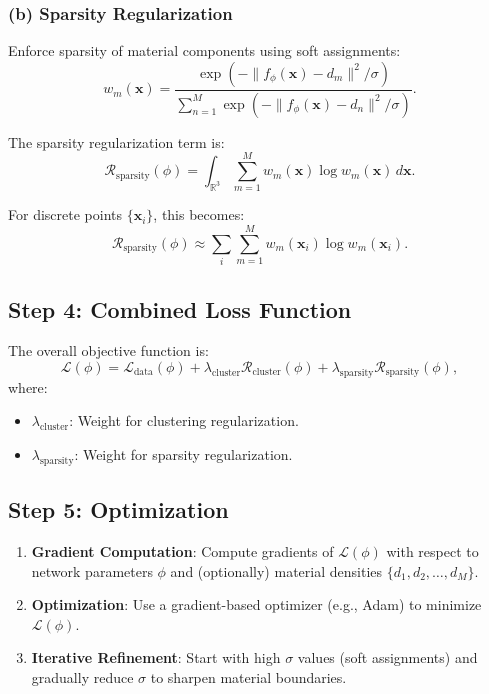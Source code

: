 \subsubsection{(b) Sparsity Regularization}
Enforce sparsity of material components using soft assignments:
\[
w_m(\mathbf{x}) = \frac{\exp(-\| f_\phi(\mathbf{x}) - d_m \|^2 / \sigma)}{\sum_{n=1}^M \exp(-\| f_\phi(\mathbf{x}) - d_n \|^2 / \sigma)}.
\]

The sparsity regularization term is:
\[
\mathcal{R}_{\text{sparsity}}(\phi) = \int_{\mathbb{R}^3} \sum_{m=1}^M w_m(\mathbf{x}) \log w_m(\mathbf{x}) \, d\mathbf{x}.
\]

For discrete points \( \{\mathbf{x}_i\} \), this becomes:
\[
\mathcal{R}_{\text{sparsity}}(\phi) \approx \sum_{i} \sum_{m=1}^M w_m(\mathbf{x}_i) \log w_m(\mathbf{x}_i).
\]

\subsection{Step 4: Combined Loss Function}
The overall objective function is:
\[
\mathcal{L}(\phi) = \mathcal{L}_{\text{data}}(\phi) + \lambda_{\text{cluster}} \mathcal{R}_{\text{cluster}}(\phi) + \lambda_{\text{sparsity}} \mathcal{R}_{\text{sparsity}}(\phi),
\]
where:
\begin{itemize}
	\item \( \lambda_{\text{cluster}} \): Weight for clustering regularization.
	\item \( \lambda_{\text{sparsity}} \): Weight for sparsity regularization.
\end{itemize}

\subsection{Step 5: Optimization}
\begin{enumerate}
	\item \textbf{Gradient Computation}: Compute gradients of \( \mathcal{L}(\phi) \) with respect to network parameters \( \phi \) and (optionally) material densities \( \{d_1, d_2, \dots, d_M\} \).
	\item \textbf{Optimization}: Use a gradient-based optimizer (e.g., Adam) to minimize \( \mathcal{L}(\phi) \).
	\item \textbf{Iterative Refinement}: Start with high \( \sigma \) values (soft assignments) and gradually reduce \( \sigma \) to sharpen material boundaries.
\end{enumerate}

